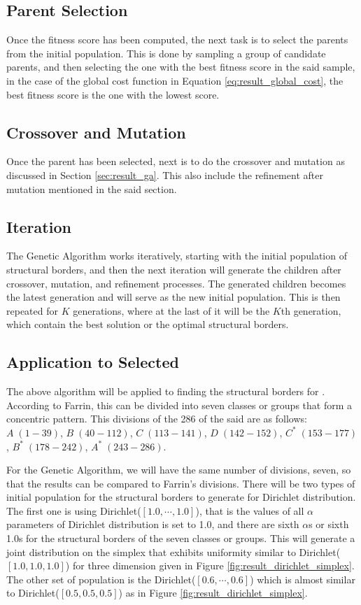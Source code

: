 \subsection{Parent Selection}
Once the fitness score has been computed, the next task is to select the parents from the initial population. This is done by sampling a group of candidate parents, and then selecting the one with the best fitness score in the said sample, in the case of the global cost function in Equation \ref{eq:result_global_cost}, the best fitness score is the one with the lowest score.
\subsection{Crossover and Mutation}
Once the parent has been selected, next is to do the crossover and mutation as discussed in Section \ref{sec:result_ga}. This also include the refinement after mutation mentioned in the said section.
\subsection{Iteration}
The Genetic Algorithm works iteratively, starting with the initial population of structural borders, and then the next iteration will generate the children after crossover, mutation, and refinement processes. The generated children becomes the latest generation and will serve as the new initial population. This is then repeated for $K$ generations, where at the last of it will be the $K$th generation, which contain the best solution or the optimal structural borders.

\subsection{Application to Selected  }
The above algorithm will be applied to finding the structural borders for  . According to Farrin, this   can be divided into seven classes or groups that form a concentric pattern. This divisions of the 286   of the said   are as follows: $A\;(1-39)$, $B\;(40-112)$, $C\;(113-141)$, $D\;(142-152)$, $C^*\;(153-177)$, $B^*\;(178-242)$, $A^*\;(243-286)$. 

For the Genetic Algorithm, we will have the same number of divisions, seven, so that the results can be compared to  Farrin's divisions. There will be two types of initial population for the structural borders to generate for Dirichlet distribution. The first one is using Dirichlet($[1.0,\cdots,1.0]$), that is the values of all $\alpha$ parameters of Dirichlet distribution is set to 1.0, and there are sixth $\alpha$s or sixth 1.0s for the structural borders of the seven classes or groups. This will generate a joint distribution on the simplex that exhibits uniformity similar to Dirichlet($[1.0,1.0,1.0]$) for three dimension given in Figure \ref{fig:result_dirichlet_simplex}. The other set of population is the Dirichlet($[0.6,\cdots,0.6]$) which is almost similar to Dirichlet($[0.5,0.5,0.5]$) as in Figure \ref{fig:result_dirichlet_simplex}. 

